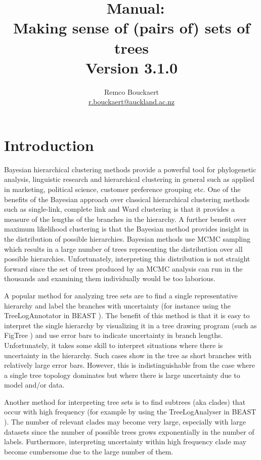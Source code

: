 \documentclass{article}
\title{\DensiTree\ Manual: \\{Making sense of (pairs of) sets of trees}\\Version 3.1.0}
\author{Remco Bouckaert\\
\url{r.bouckaert@auckland.ac.nz}\\
}
\begin{document}
\maketitle
\newpage
\tableofcontents
\newpage


\section{Introduction}

Bayesian hierarchical clustering methods provide a powerful tool for phylogenetic 
analysis, linguistic research and hierarchical clustering in general such as applied
in marketing, political science, customer preference grouping etc.
One of the benefits of the Bayesian approach over classical hierarchical clustering
methods such as single-link, complete link and Ward clustering is that it provides
a measure of the lengths of the branches in the hierarchy. A further benefit over
maximum likelihood clustering is that the Bayesian method provides insight in the 
distribution of possible hierarchies.
Bayesian methods use MCMC sampling which results in a large number of trees
representing the distribution over all possible hierarchies.
Unfortunately, interpreting this distribution is not straight forward since
the set of trees produced by an MCMC analysis can run in the thousands
and examining them individually would be too laborious.

A popular method for analyzing tree sets are to find a single representative
hierarchy and label the branches with uncertainty (for instance using the
TreeLogAnnotator in BEAST \cite{BEAST}). The benefit of this method is that it is 
easy to interpret the single hierarchy by visualizing it in a tree drawing program
(such as FigTree \cite{FigTree}) and use error bars to indicate uncertainty in 
branch lengths. Unfortunately, it takes some skill to interpret situations
where there is uncertainty in the hierarchy. Such cases show in the tree
as short branches with relatively large error bars. However, this is indistinguishable
from the case where a single tree topology dominates but where there is large 
uncertainty due to model and/or data.

Another method for interpreting tree sets is to find subtrees (aka clades) that
occur with high frequency (for example by using the TreeLogAnalyser in BEAST 
\cite{BEAST}). The number of relevant clades may become very large, especially
with large datasets since the number of possible trees grows exponentially
in the number of labels. Furthermore, interpreting uncertainty within high
frequency clade may become cumbersome due to the large number of them.
\end{document}
